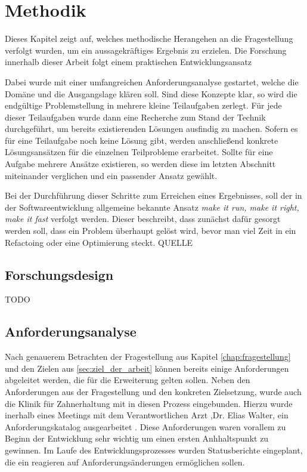 \chapter{Methodik}
\label{chap:methodik} Dieses Kapitel zeigt auf, welches methodische Herangehen
an die Fragestellung verfolgt wurden, um ein aussagekräftiges Ergebnis zu erzielen.
Die Forschung innerhalb dieser Arbeit folgt einem praktischen Entwicklungsansatz

Dabei wurde mit einer umfangreichen Anforderungsanalyse gestartet, welche die
Domäne und die Ausgangslage klären soll. Sind diese Konzepte klar, so wird die
endgültige Problemstellung in mehrere kleine Teilaufgaben zerlegt. Für jede dieser
Teilaufgaben wurde dann eine Recherche zum Stand der Technik durchgeführt, um
bereits existierenden Lösungen ausfindig zu machen. Sofern es für eine Teilaufgabe
noch keine Lösung gibt, werden anschließend konkrete Lösungsansätzen für die
einzelnen Teilprobleme erarbeitet. Sollte für eine Aufgabe mehrere Ansätze existieren,
so werden diese im letzten Abschnitt miteinander verglichen und ein passender
Ansatz gewählt.

Bei der Durchführung dieser Schritte zum Erreichen eines Ergebnisses, soll der in
der Softwareentwicklung allgemeine bekannte Ansatz \textit{make it run, make it right,
make it fast} verfolgt werden. Dieser beschreibt, dass zunächst dafür gesorgt
werden soll, dass ein Problem überhaupt gelöst wird, bevor man viel Zeit in ein
Refactoing oder eine Optimierung steckt. QUELLE

\section{Forschungsdesign}
TODO

\section{Anforderungsanalyse}
\label{sec:anforderungsanalyse} Nach genauerem Betrachten der Fragestellung aus Kapitel
\ref{chap:fragestellung} und den Zielen aus \ref{sec:ziel_der_arbeit} können bereits
einige Anforderungen abgeleitet werden, die für die Erweiterung gelten sollen. Neben
den Anforderungen aus der Fragestellung und den konkreten Zielsetzung, wurde
auch die Klinik für Zahnerhaltung mit in diesen Prozess eingebunden. Hierzu wurde
inerhalb eines Meetings mit dem Verantwortlichen Arzt ,Dr. Elias Walter, ein
Anforderungskatalog ausgearbeitet \citep[vgl.][]{walter2025}. Diese
Anforderungen waren vorallem zu Beginn der Entwicklung sehr wichtig um einen
ersten Anhhaltspunkt zu gewinnen. Im Laufe des Entwicklungsprozesses wurden Statusberichte
eingeplant, die ein reagieren auf Anforderungsänderungen ermöglichen sollen.

